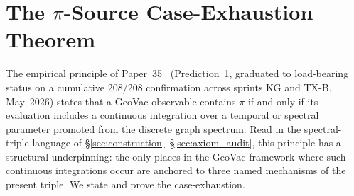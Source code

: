 \documentclass[11pt]{article}
\begin{document}
\section{The $\pi$-Source Case-Exhaustion Theorem}
\label{sec:pi_source_theorem}

The empirical principle of Paper~35~\cite{paper35} (Prediction~1,
graduated to load-bearing status on a cumulative 208/208 confirmation
across sprints KG and TX-B, May~2026) states that a GeoVac observable
contains $\pi$ if and only if its evaluation includes a continuous
integration over a temporal or spectral parameter promoted from the
discrete graph spectrum.  Read in the spectral-triple language of
\S\ref{sec:construction}--\S\ref{sec:axiom_audit}, this principle has
a structural underpinning: the only places in the GeoVac framework
where such continuous integrations occur are anchored to three named
mechanisms of the present triple.  We state and prove the
case-exhaustion.
\end{document}
